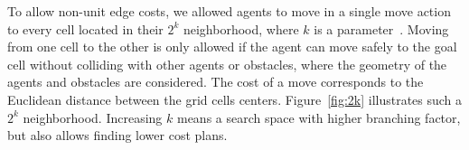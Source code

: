 \documentclass[review]{elsarticle}
\newcommand\roni[1]{\nb{\textbf{Roni:}}{green}{#1}}
\begin{document}
To allow non-unit edge costs, we allowed agents to move in a single move action to every cell located in their $2^k$ neighborhood, where $k$ is a parameter~\cite{rivera2017grid}. Moving from one cell to the other is only allowed if the agent can move safely to the goal cell without colliding with other agents or obstacles, where the geometry of the agents and obstacles are considered. The cost of a move corresponds to the Euclidean distance between the grid cells centers.  Figure~\ref{fig:2k} illustrates such a $2^k$ neighborhood. Increasing $k$ means a search space with higher branching factor, but also allows finding lower cost plans. 
\end{document}
